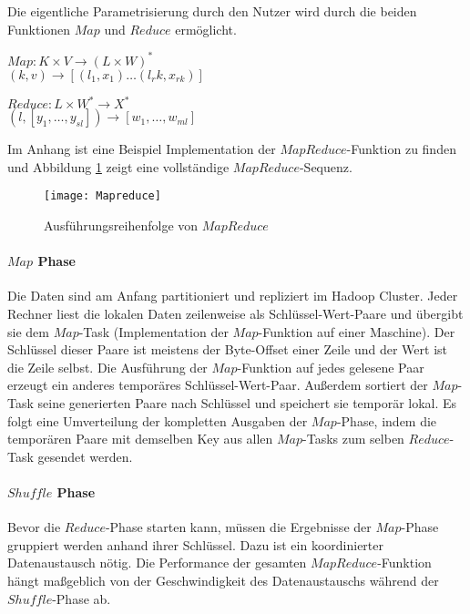 Die eigentliche Parametrisierung durch den Nutzer wird durch die beiden Funktionen $Map$ und $Reduce$ ermöglicht.

\begin{center}
    $Map: K \times V \rightarrow (L \times W)^\ast$\\$(k, v) \rightarrow [(l_1, x_1) \dots (l_rk, x_{rk})]$
\end{center}
\begin{center}
    $Reduce: L \times W^\ast \rightarrow X^\ast$\\$(l, [y_1, \dots, y_{sl}]) \rightarrow [w_1, \dots, w_{ml}]$
\end{center}

Im Anhang ist eine Beispiel Implementation der $MapReduce$-Funktion zu finden und Abbildung \ref{fig:mapreduce} zeigt eine vollständige $MapReduce$-Sequenz.

\begin{figure}[h!]
    \centering
    \texttt{[image: Mapreduce]}
    \caption{Ausführungsreihenfolge von $MapReduce$\cite{dg04}}
    \label{fig:mapreduce}
\end{figure}

\paragraph{$Map$ Phase}$\;$ \\
Die Daten sind am Anfang partitioniert und repliziert im Hadoop Cluster. Jeder Rechner liest die lokalen Daten zeilenweise als Schlüssel-Wert-Paare und übergibt sie dem $Map$-Task (Implementation der $Map$-Funktion auf einer Maschine). Der Schlüssel dieser Paare ist meistens der Byte-Offset einer Zeile und der Wert ist die Zeile selbst. Die Ausführung der $Map$-Funktion auf jedes gelesene Paar erzeugt ein anderes temporäres Schlüssel-Wert-Paar. Außerdem sortiert der $Map$-Task seine generierten Paare nach Schlüssel und speichert sie temporär lokal. Es folgt eine Umverteilung der kompletten Ausgaben der $Map$-Phase, indem die temporären Paare mit demselben Key aus allen $Map$-Tasks zum selben $Reduce$-Task gesendet werden.

\paragraph{$Shuffle$ Phase}$\;$ \\
Bevor die $Reduce$-Phase starten kann, müssen die Ergebnisse der $Map$-Phase gruppiert werden anhand ihrer Schlüssel. Dazu ist ein koordinierter Datenaustausch nötig. Die Performance der gesamten $MapReduce$-Funktion hängt maßgeblich von der Geschwindigkeit des Datenaustauschs während der $Shuffle$-Phase ab.

